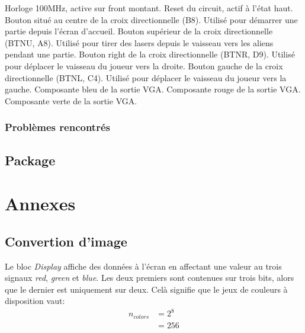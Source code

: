 \documentclass[french]{nakrule}
\begin{document}
\begin{descr}
   Horloge 100MHz, active sur front montant.
   Reset du circuit, actif à l'état haut.
   Bouton situé au centre de la croix directionnelle (B8).
  Utilisé pour démarrer une partie depuis l'écran d'accueil.
   Bouton supérieur de la croix directionnelle (BTNU, A8).
  Utilisé pour tirer des lasers depuis le vaisseau vers les aliens pendant une partie.
   Bouton right de la croix directionnelle (BTNR, D9). Utilisé
  pour déplacer le vaisseau du joueur vers la droite.
   Bouton gauche de la croix directionnelle (BTNL, C4). Utilisé
  pour déplacer le vaisseau du joueur vers la gauche.
   Composante bleu de la sortie VGA.
   Composante rouge de la sortie VGA.
   Composante verte de la sortie VGA.
\end{descr}

\subsection{Problèmes rencontrés}
\label{subsec:Problèmes_rencontrés_alienRocket}

\clearpage


\section{Package}
\label{sec:package}

\asymmetricalPage
\chapter{Annexes}

\symmetricalPage

\section{Convertion d'image}
\label{sec:convertPicture}

Le bloc \emph{Display} affiche des données à l'écran en affectant une valeur au
trois signaux \emph{red}, \emph{green} et \emph{blue}. Les deux premiers sont
contenues sur trois bits, alors que le dernier est uniquement sur deux. Celà
signifie que le jeux de couleurs à disposition vaut:
\begin{align*}
  n_{colors} &= 2^{8}\\
             &= 256
\end{align*}
\end{document}
